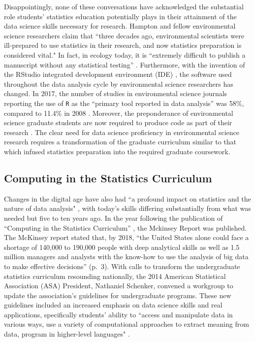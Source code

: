 \documentclass[12pt]{article}
\begin{document}
\quad Disappointingly, none of these conversations have acknowledged the 
substantial role students' statistics education potentially plays in their 
attainment of the data science skills necessary for research. Hampton and 
fellow environmental science researchers claim that ``three decades ago, 
environmental scientists were ill-prepared to use statistics in their research, 
and now statistics preparation is considered vital." In fact, in ecology today,
it is ``extremely difficult to publish a manuscript without any statistical 
testing'' \citep[p. 547]{hampton}. Furthermore, with the invention 
of the RStudio integrated development environment (IDE) \citep{rstudio}, the
software used throughout the data analysis cycle by environmental science
researchers has changed. In 2017, the number of studies in environmental science
journals reporting the use of \texttt{R} as the ``primary tool reported in data 
analysis'' was 58\%, compared to 11.4\% in 2008 \citep[p. 1]{Rpopular}. 
Moreover, the preponderance of environmental science graduate students are now 
required to produce code as part of their research \citep{mislan}. The clear 
need for data science proficiency in environmental science research requires a
transformation of the graduate curriculum similar to that which infused
statistics preparation into the required graduate coursework. 

\subsection{Computing in the Statistics Curriculum}

\quad Changes in the digital age have also had ``a profound impact on statistics
and the nature of data analysis" \citep[p. 97]{nolan}, with today's skills 
differing substantially from what was needed but five to ten years ago. 
In the year following the publication of ``Computing in the Statistics 
Curriculum'' \citep{nolan}, the Mckinsey Report \citep{mckinsey} was published. 
The McKinsey report stated that, by 2018, ``the United States alone could face a
shortage of 140,000 to 190,000 people with deep analytical skills as well as 1.5
million managers and analysts with the know-how to use the analysis of big data
to make effective decisions'' (p.\ 3). With calls to transform the undergraduate
statistics curriculum resounding nationally, the 2014 American Statistical 
Association (ASA) President, Nathaniel Schenker, convened a workgroup to update
the association's guidelines for undergraduate programs. These new guidelines 
included an increased emphasis on data science skills and real applications, 
specifically students' ability to ``access and manipulate data in various ways,
use a variety of computational approaches to extract meaning from data, program
in higher-level languages" \citep[p.\ 7]{asa}. 
\end{document}
